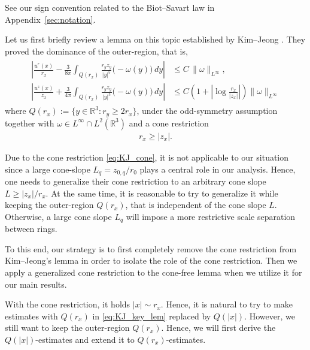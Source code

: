 \documentclass[reqno,11pt]{amsart}
\begin{document}
See our sign convention related to the Biot--Savart law in Appendix~\ref{sec:notation}.

Let us first briefly review a lemma on this topic established by Kim--Jeong \cite[Lemma 2.1]{KimJeong22}. They proved the dominance of the outer-region, that is,
    \begin{align}
    \label{eq:KJ_key_lem}
    \begin{aligned}
        \left| \frac{u^r(x)}{r_x} - \frac{3}{8\pi} \int_{Q(r_x)} \frac{r_y z_y}{|y|^5}  \big( -\omega(y) \big) \, dy \right| 
    &\le 
    C \, \|\omega\|_{L^\infty}, 
    \\
    \left| \frac{u^z(x)}{z_x} + \frac{3}{4\pi}   \int_{Q(r_x)} \frac{r_y z_y}{|y|^5} \big( -\omega(y) \big) \, dy \right| 
    &\le C  \left( 1 + \left| \log \frac{r_x}{|z_x|} \right| \right) \|\omega\|_{L^\infty}
    \end{aligned}
\end{align}
where $Q(r_x) := \{ y \in \mathbb{R}^3 : r_y \ge 2r_x \}$,
under the odd-symmetry assumption together with $\omega\in L^\infty \cap L^2(\mathbb{R}^3)$ and a cone restriction
    \begin{align}
    \label{eq:KJ_cone}
        r_x \geq |z_x|.
    \end{align}

Due to the cone restriction \eqref{eq:KJ_cone}, it is not applicable to our situation since a large cone-slope $L_q=z_{0,q}/r_0$ plays a central role in our analysis. Hence, one needs to generalize their cone restriction to an arbitrary cone slope $L\geq |z_x|/r_x$. At the same time, it is reasonable to try to generalize it while keeping the outer-region $Q(r_x)$, that is independent of the cone slope $L$. Otherwise, a large cone slope $L_q$ will impose a more restrictive scale separation between rings. 

To this end, our strategy is to first completely remove the cone restriction from Kim--Jeong's lemma in order to isolate the role of the cone restriction. Then we apply a generalized cone restriction to the cone-free lemma when we utilize it for our main results.

With the cone restriction, it holds $|x|\sim r_x$. Hence, it is natural to  try to make estimates with $Q(r_x)$ in \eqref{eq:KJ_key_lem} replaced by $Q(|x|)$. However, we still want to keep the outer-region $Q(r_x)$. Hence, we will first derive the $Q(|x|)$-estimates and extend it to $Q(r_x)$-estimates. 
\end{document}
